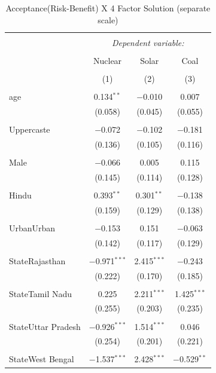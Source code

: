 \documentclass[
]{article}
\begin{document}
\begin{table}[!htbp] \centering 
  \caption{Acceptance(Risk-Benefit) X 4 Factor Solution (separate scale)} 
  \label{} 
\begin{tabular}{@{\extracolsep{5pt}}lccc} 
\\[-1.8ex]\hline 
\hline \\[-1.8ex] 
 & \multicolumn{3}{c}{\textit{Dependent variable:}} \\ 
\cline{2-4} 
\\[-1.8ex] & Nuclear & Solar & Coal \\ 
\\[-1.8ex] & (1) & (2) & (3)\\ 
\hline \\[-1.8ex] 
 age & 0.134$^{**}$ & $-$0.010 & 0.007 \\ 
  & (0.058) & (0.045) & (0.055) \\ 
  & & & \\ 
 Uppercaste & $-$0.072 & $-$0.102 & $-$0.181 \\ 
  & (0.136) & (0.105) & (0.116) \\ 
  & & & \\ 
 Male & $-$0.066 & 0.005 & 0.115 \\ 
  & (0.145) & (0.114) & (0.128) \\ 
  & & & \\ 
 Hindu & 0.393$^{**}$ & 0.301$^{**}$ & $-$0.138 \\ 
  & (0.159) & (0.129) & (0.138) \\ 
  & & & \\ 
 UrbanUrban & $-$0.153 & 0.151 & $-$0.063 \\ 
  & (0.142) & (0.117) & (0.129) \\ 
  & & & \\ 
 StateRajasthan & $-$0.971$^{***}$ & 2.415$^{***}$ & $-$0.243 \\ 
  & (0.222) & (0.170) & (0.185) \\ 
  & & & \\ 
 StateTamil Nadu & 0.225 & 2.211$^{***}$ & 1.425$^{***}$ \\ 
  & (0.255) & (0.203) & (0.235) \\ 
  & & & \\ 
 StateUttar Pradesh & $-$0.926$^{***}$ & 1.514$^{***}$ & 0.046 \\ 
  & (0.254) & (0.201) & (0.221) \\ 
  & & & \\ 
 StateWest Bengal & $-$1.537$^{***}$ & 2.428$^{***}$ & $-$0.529$^{**}$ \\ 

\end{tabular}
\end{table}
\end{document}
